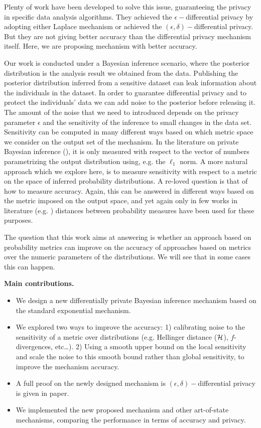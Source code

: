 \documentclass{article}
\begin{document}
Plenty of work have been developed to solve this issue, guaranteeing the privacy in specific data analysis algorithms. They achieved the $\epsilon-$differential privacy by adopting either Laplace mechanism or achieved the $(\epsilon, \delta)-$differential privacy. But they are not giving better accuracy than the differential privacy mechanism itself. Here, we are proposing mechanism with better accuracy.

Our work is conducted under a Bayesian inference scenario, where the posterior distribution is the analysis result we obtained from the data.
Publishing the posterior distribution inferred from a sensitive dataset can
leak information about the individuals in the dataset.
In order to guarantee differential privacy and to protect the
individuals' data we can add noise to the posterior before releasing it.
The amount of the noise that we need to introduced
depends on the privacy parameter $\epsilon$ and the sensitivity of the inference to
small changes in the data set. 
Sensitivity can be computed in many different ways based on which metric space
we consider on the output set of the mechanism. In the literature on private Bayesian
inference (\cite{zhang2016differential,xiao2012bayesian}), it is only measured with
respect to the vector of numbers parametrizing the output distribution using, e.g. the $\ell_1$ norm.
A more natural approach which we explore here, is to measure sensitivity with respect to a metric on the space of inferred probability distributions.
A re-loved question is that of how to measure accuracy. Again,
this can be answered in different ways based on the metric imposed on the output space, and yet again
only in few works in literature (e.g. \cite{zhang2016differential})
distances between probability measures have been used for these purposes.


The question that this work aims at answering is whether
an approach based on probability metrics can improve on
the accuracy of approaches based on metrics over
the numeric parameters of the distributions. 
We will see that in some cases this can happen.

\noindent \textbf{Main contributions.}
\begin{itemize}
	\item We design a new differentially private Bayesian inference mechanism based on the standard exponential mechanism.

	\item We explored two ways to improve the accuracy: 1) calibrating noise to the sensitivity of a metric over distributions (e.g. Hellinger distance ($\mathcal{H}$), $f$-divergences, etc\dots). 2) Using a smooth upper bound on the local sensitivity and scale the noise to this smooth bound rather than global sensitivity, to improve the mechanism accuracy.

  \item A full proof on the newly designed mechanism is $(\epsilon, \delta)-$differential privacy is given in paper.

	\item We implemented the new proposed mechanism and other art-of-state mechanisms, comparing the performance in terms of accuracy and privacy.
\end{itemize}
\end{document}
